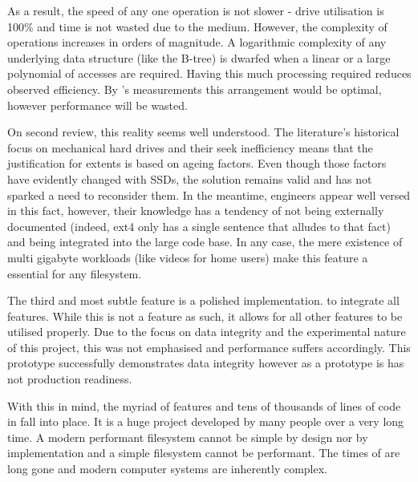         As a result, the speed of any one operation is not slower - drive
        utilisation is 100\% and time is not wasted due to the medium. However,
        the complexity of operations increases in orders of magnitude. A
        logarithmic complexity of any underlying data structure (like the
        B-tree) is dwarfed when a linear or a large polynomial of accesses are
        required. Having this much processing required reduces observed
        efficiency. By 's measurements this arrangement would
        be optimal, however performance will be wasted.

        On second review, this reality seems well understood. The literature's
        historical focus on mechanical hard drives and their seek inefficiency
        means that the justification for extents is based on ageing factors.
        Even though those factors have evidently changed with SSDs, the
        solution remains valid and has not sparked a need to reconsider them.
        In the meantime, engineers appear well versed in this fact, however,
        their knowledge has a tendency of not being externally documented
        (indeed, ext4 only has a single sentence that alludes to that fact) and
        being integrated into the large code base. In any case, the mere
        existence of multi gigabyte workloads (like videos for home users) make
        this feature a essential for any filesystem.

        The third and most subtle feature is a polished implementation.  to
        integrate all features. While this is not a feature as such, it allows
        for all other features to be utilised properly. Due to the focus on
        data integrity and the experimental nature of this project, this was
        not emphasised and performance suffers accordingly. This prototype
        successfully demonstrates data integrity however as a prototype is has
        not production readiness.

        With this in mind, the myriad of features and tens of thousands of
        lines of code in  fall into place. It is a huge
        project developed by many people over a very long time. A modern
        performant filesystem cannot be simple by design nor by implementation
        and a simple filesystem cannot be performant. The times of
         are long gone and modern computer systems are
        inherently complex.


